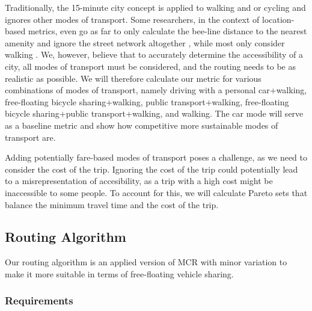 Traditionally, the 15-minute city concept is applied to walking and or cycling and ignores other modes of transport.
Some researchers, in the context of location-based metrics, even go as far to only calculate the bee-line distance to the nearest amenity and ignore the street network altogether \cite{gastnerOptimalDesignSpatial2006}, while most only consider walking \cite{olivariAreItalianCities2023, nicolettiDisadvantagedCommunitiesHave2023}.
We, however, believe that to accurately determine the accessibility of a city, all modes of transport must be considered, and the routing needs to be as realistic as possible.
We will therefore calculate our metric for various combinations of modes of transport, namely driving with a personal car+walking, free-floating bicycle sharing+walking, public transport+walking, free-floating bicycle sharing+public transport+walking, and walking.
The car mode will serve as a baseline metric and show how competitive more sustainable modes of transport are.

Adding potentially fare-based modes of transport poses a challenge, as we need to consider the cost of the trip.
Ignoring the cost of the trip could potentially lead to a misrepresentation of accesibility, as a trip with a high cost might be inaccessible to some people.
To account for this, we will calculate Pareto sets that balance the minimum travel time and the cost of the trip.



\subsection{Routing Algorithm}
\label{subs:routing_algorithm}

Our routing algorithm is an applied version of MCR with minor variation to make it more suitable in terms of free-floating vehicle sharing.

\subsubsection{Requirements}
\label{subsubsec:requirements}


